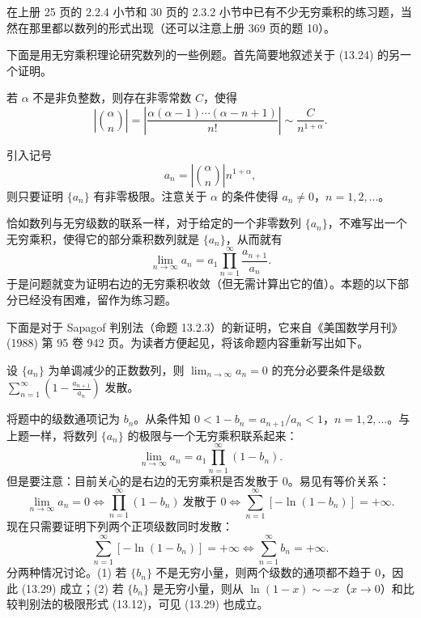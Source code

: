 在上册 25 页的 2.2.4 小节和 30 页的 2.3.2 小节中已有不少无穷乘积的练习题，当然在那里都以数列的形式出现（还可以注意上册 369 页的题 10）。

下面是用无穷乘积理论研究数列的一些例题。首先简要地叙述关于 (13.24) 的另一个证明。

\begin{xexample}[13.4.1]
若 $\alpha$ 不是非负整数，则存在非零常数 $C$，使得
\[
\left|\binom{\alpha}{n}\right|=\left|\frac{\alpha(\alpha-1)\cdots(\alpha-n+1)}{n!}\right|\sim\frac C{n^{1+\alpha}}.
\]
\end{xexample}
\begin{xproof}
引入记号
\[
a_n=\left|\binom{\alpha}{n}\right|n^{1+\alpha},
\]
则只要证明 $\{a_n\}$ 有非零极限。注意关于 $\alpha$ 的条件使得 $a_n\neq0$，$n=1,2,\ldots$。

恰如数列与无穷级数的联系一样，对于给定的一个非零数列 $\{a_n\}$，不难写出一个无穷乘积，使得它的部分乘积数列就是 $\{a_n\}$，从而就有
\begin{equation}
\lim_{n\to\infty}a_n=a_1\prod_{n=1}^{\infty}\frac{a_{n+1}}{a_n}.
\tag{13.28}
\end{equation}
于是问题就变为证明右边的无穷乘积收敛（但无需计算出它的值）。本题的以下部分已经没有困难，留作为练习题。
\end{xproof}

下面是对于 Sapagof 判别法（命题 13.2.3）的新证明，它来自《美国数学月刊》(1988) 第 95 卷 942 页。为读者方便起见，将该命题内容重新写出如下。

\begin{xexample}[13.4.2]
设 $\{a_n\}$ 为单调减少的正数数列，则 $\lim_{n\to\infty}a_n=0$ 的充分必要条件是级数 $\sum_{n=1}^{\infty}\left(1-\frac{a_{n+1}}{a_n}\right)$ 发散。
\end{xexample}
\begin{xproof}
将题中的级数通项记为 $b_n$。从条件知 $0<1-b_n=a_{n+1}/a_n<1$，$n=1,2,\ldots$。与上题一样，将数列 $\{a_n\}$ 的极限与一个无穷乘积联系起来：
\[
\lim_{n\to\infty}a_n=a_1\prod_{n=1}^{\infty}(1-b_n).
\]
但是要注意：目前关心的是右边的无穷乘积是否发散于 0。易见有等价关系：
\[
\lim_{n\to\infty}a_n=0\Longleftrightarrow\prod_{n=1}^{\infty}(1-b_n)\ \text{发散于 }0
\Longleftrightarrow\sum_{n=1}^{\infty}[-\ln(1-b_n)]=+\infty.
\]
现在只需要证明下列两个正项级数同时发散：
\begin{equation}
\sum_{n=1}^{\infty}[-\ln(1-b_n)]=+\infty\Longleftrightarrow\sum_{n=1}^{\infty}b_n=+\infty.
\tag{13.29}
\end{equation}
分两种情况讨论。(1) 若 $\{b_n\}$ 不是无穷小量，则两个级数的通项都不趋于 0，因此 (13.29) 成立；(2) 若 $\{b_n\}$ 是无穷小量，则从 $\ln(1-x)\sim-x$（$x\to0$）和比较判别法的极限形式 (13.12)，可见 (13.29) 也成立。
\end{xproof}


